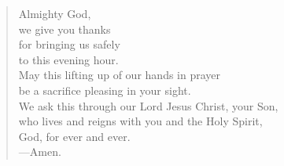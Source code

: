 \prayer

\setlength{\leftmargini}{\prayerleftmargini}

\begin{verse}
Almighty God,\\
we give you thanks\\
for bringing us safely\\
to this evening hour.\\
May this lifting up of our hands in prayer\\
be a sacrifice pleasing in your sight.\\
We ask this through our Lord Jesus Christ, your Son,\\
who lives and reigns with you and the Holy Spirit,\\
God, for ever and ever.\\
{\color{red}---\thinspace}Amen.
\end{verse}

\setlength{\leftmargini}{\defleftmargini}